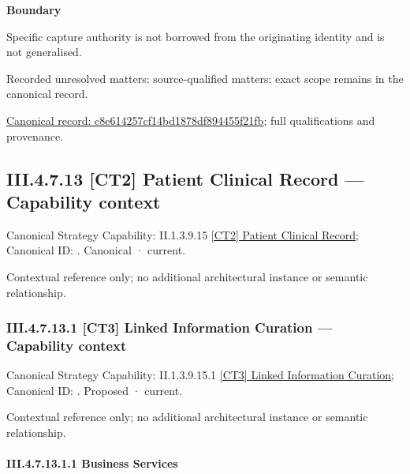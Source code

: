 \textbf{Boundary}



Specific capture authority is not borrowed from the originating identity and is not generalised.


{\small Recorded unresolved matters: source-qualified matters; exact scope remains in the canonical record.}\par
{\footnotesize \href{../../../../../../../continuum/business/business-function/c8e614257cf14bd1878df894455f21fb.md}{Canonical record: c8e614257cf14bd1878df894455f21fb}; full qualifications and provenance.}\par
\subsection*{III.4.7.13 [CT2] Patient Clinical Record — Capability context}
\label{navigation:III.4.7.13}

{\small Canonical Strategy Capability: II.1.3.9.15 \hyperref[element:5478878e0e6e4d34a8d5023ac6ac2d54]{[CT2] Patient Clinical Record}; Canonical ID: \texttt{}. Canonical · current.}\par
Contextual reference only; no additional architectural instance or semantic relationship.\par
\subsubsection*{III.4.7.13.1 [CT3] Linked Information Curation — Capability context}
\label{navigation:III.4.7.13.1}

{\small Canonical Strategy Capability: II.1.3.9.15.1 \hyperref[element:5edb2a8b5ee54ddda8104d1fab323a94]{[CT3] Linked Information Curation}; Canonical ID: \texttt{}. Proposed · current.}\par
Contextual reference only; no additional architectural instance or semantic relationship.\par
\paragraph*{III.4.7.13.1.1 Business Services}
\label{navigation:III.4.7.13.1.1}

